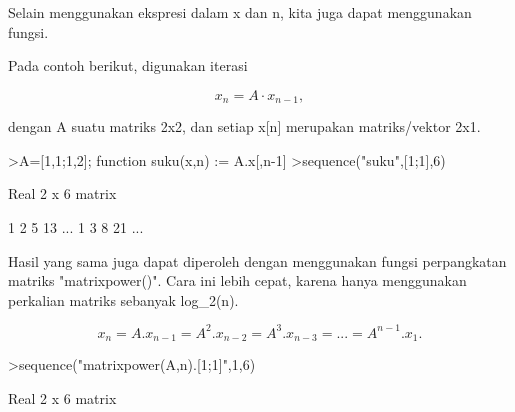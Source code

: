 \documentclass[a4paper,10pt]{article}
\begin{document}
\begin{eulernotebook}
\begin{eulercomment}
\begin{eulercomment}
\begin{eulercomment}
\begin{eulercomment}
\begin{eulercomment}
\begin{eulercomment}
\begin{eulercomment}
\begin{eulercomment}
\begin{eulercomment}
\begin{eulercomment}
\begin{eulercomment}
\begin{eulercomment}
\begin{eulercomment}
\begin{eulercomment}
\begin{eulercomment}
\begin{eulercomment}
\begin{eulercomment}
\begin{eulercomment}
\begin{eulercomment}
\begin{eulercomment}
\begin{eulercomment}
\begin{eulercomment}
\begin{euleroutput}
  [1,  1,  2,  4,  8,  16,  32,  64,  128,  256]
\end{euleroutput}
\begin{eulercomment}
Selain menggunakan ekspresi dalam x dan n, kita juga dapat menggunakan
fungsi.

Pada contoh berikut, digunakan iterasi

\end{eulercomment}
\begin{eulerformula}
\[
x_n =A \cdot x_{n-1},
\]
\end{eulerformula}
\begin{eulercomment}
dengan A suatu matriks 2x2, dan setiap x[n] merupakan matriks/vektor
2x1.
\end{eulercomment}
\begin{eulerprompt}
>A=[1,1;1,2]; function suku(x,n) := A.x[,n-1]
>sequence("suku",[1;1],6)
\end{eulerprompt}
\begin{euleroutput}
  Real 2 x 6 matrix
  
              1             2             5            13     ...
              1             3             8            21     ...
\end{euleroutput}
\begin{eulercomment}
Hasil yang sama juga dapat diperoleh dengan menggunakan fungsi
perpangkatan matriks "matrixpower()". Cara ini lebih cepat, karena
hanya menggunakan perkalian matriks sebanyak log\_2(n).

\end{eulercomment}
\begin{eulerformula}
\[
x_n=A.x_{n-1}=A^2.x_{n-2}=A^3.x_{n-3}= ... = A^{n-1}.x_1.
\]
\end{eulerformula}
\begin{eulerprompt}
>sequence("matrixpower(A,n).[1;1]",1,6)
\end{eulerprompt}
\begin{euleroutput}
  Real 2 x 6 matrix
  

\end{euleroutput}
\end{eulercomment}
\end{eulercomment}
\end{eulercomment}
\end{eulercomment}
\end{eulercomment}
\end{eulercomment}
\end{eulercomment}
\end{eulercomment}
\end{eulercomment}
\end{eulercomment}
\end{eulercomment}
\end{eulercomment}
\end{eulercomment}
\end{eulercomment}
\end{eulercomment}
\end{eulercomment}
\end{eulercomment}
\end{eulercomment}
\end{eulercomment}
\end{eulercomment}
\end{eulercomment}
\end{eulercomment}
\end{eulernotebook}
\end{document}
